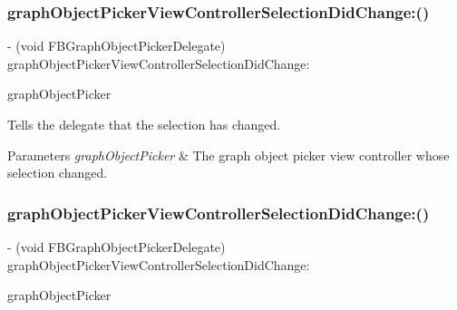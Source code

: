 \subsubsection{\texorpdfstring{graph\+Object\+Picker\+View\+Controller\+Selection\+Did\+Change\+:()}{graphObjectPickerViewControllerSelectionDidChange:()}\hspace{0.1cm}{\footnotesize\ttfamily [4/5]}}
{\footnotesize\ttfamily -\/ (void F\+B\+Graph\+Object\+Picker\+Delegate) graph\+Object\+Picker\+View\+Controller\+Selection\+Did\+Change\+: \begin{DoxyParamCaption}\item[{(\hyperlink{interfaceFBGraphObjectPickerViewController}{F\+B\+Graph\+Object\+Picker\+View\+Controller} $\ast$)}]{graph\+Object\+Picker }\end{DoxyParamCaption}\hspace{0.3cm}{\ttfamily [optional]}}

Tells the delegate that the selection has changed.


\begin{DoxyParams}{Parameters}
{\em graph\+Object\+Picker} & The graph object picker view controller whose selection changed. \\
\hline
\end{DoxyParams}
\mbox{\label{protocolFBGraphObjectPickerDelegate_01-p_a7c9da228bb329ef648df31794c7c7113}} 
\subsubsection{\texorpdfstring{graph\+Object\+Picker\+View\+Controller\+Selection\+Did\+Change\+:()}{graphObjectPickerViewControllerSelectionDidChange:()}\hspace{0.1cm}{\footnotesize\ttfamily [5/5]}}
{\footnotesize\ttfamily -\/ (void F\+B\+Graph\+Object\+Picker\+Delegate) graph\+Object\+Picker\+View\+Controller\+Selection\+Did\+Change\+: \begin{DoxyParamCaption}\item[{(\hyperlink{interfaceFBGraphObjectPickerViewController}{F\+B\+Graph\+Object\+Picker\+View\+Controller} $\ast$)}]{graph\+Object\+Picker }\end{DoxyParamCaption}\hspace{0.3cm}{\ttfamily [optional]}}


